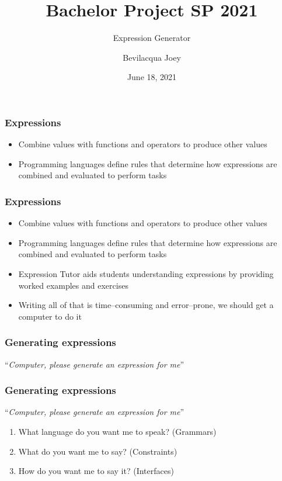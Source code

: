 \documentclass[t,aspectratio=32]{beamer}
\title{Bachelor Project SP 2021}
\subtitle{Expression Generator}
\author{Bevilacqua Joey}
\institute{Universit\`a della Svizzera Italiana}
\date{June 18, 2021}
\begin{document}

\begin{frame}
\maketitle
\end{frame}


\begin{frame}
\frametitle{Expressions}

\begin{itemize}
\item Combine values with functions and operators to produce other values
\item Programming languages define rules that determine how expressions are
      combined and evaluated to perform tasks
\end{itemize}
\end{frame}

\begin{frame}
\frametitle{Expressions}

\begin{itemize}
\item Combine values with functions and operators to produce other values
\item Programming languages define rules that determine how expressions are
      combined and evaluated to perform tasks
\item Expression Tutor aids students understanding expressions by providing
      worked examples and exercises
\item Writing all of that is time–consuming and error–prone, we should
      get a computer to do it
\end{itemize}
\end{frame}



\begin{frame}
\frametitle{Generating expressions}

``\textit{Computer, please generate an expression for me}''
\end{frame}

\begin{frame}
\frametitle{Generating expressions}

``\textit{Computer, please generate an expression for me}''
\vspace{1em}
\begin{enumerate}
\item What language do you want me to speak? (Grammars)
\item What do you want me to say? (Constraints)
\item How do you want me to say it? (Interfaces)
\end{enumerate}
\end{frame}
\end{document}
